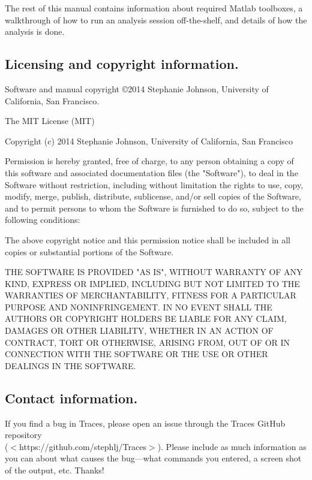 \documentclass[11pt]{article}
\newcommand{\sj}[1]{\textcolor{red}{#1}}
\begin{document}
The rest of this manual contains information about required Matlab toolboxes, a walkthrough of how to run an analysis session off-the-shelf, and details of how the analysis is done.


\subsection{Licensing and copyright information.}

Software and manual copyright \copyright 2014 Stephanie Johnson, University of California, San Francisco.

 The MIT License (MIT)
 
 Copyright (c) 2014 Stephanie Johnson, University of California, San Francisco
 
 Permission is hereby granted, free of charge, to any person obtaining a copy
 of this software and associated documentation files (the "Software"), to deal
 in the Software without restriction, including without limitation the rights
 to use, copy, modify, merge, publish, distribute, sublicense, and/or sell
 copies of the Software, and to permit persons to whom the Software is
 furnished to do so, subject to the following conditions:
 
 The above copyright notice and this permission notice shall be included in all
 copies or substantial portions of the Software.
 
 THE SOFTWARE IS PROVIDED "AS IS", WITHOUT WARRANTY OF ANY KIND, EXPRESS OR
 IMPLIED, INCLUDING BUT NOT LIMITED TO THE WARRANTIES OF MERCHANTABILITY,
 FITNESS FOR A PARTICULAR PURPOSE AND NONINFRINGEMENT. IN NO EVENT SHALL THE
 AUTHORS OR COPYRIGHT HOLDERS BE LIABLE FOR ANY CLAIM, DAMAGES OR OTHER
 LIABILITY, WHETHER IN AN ACTION OF CONTRACT, TORT OR OTHERWISE, ARISING FROM,
 OUT OF OR IN CONNECTION WITH THE SOFTWARE OR THE USE OR OTHER DEALINGS IN THE
 SOFTWARE.
    
\subsection{Contact information.}

If you find a bug in Traces, please open an issue through the Traces GitHub repository \\
($<$https://github.com/stephlj/Traces$>$). Please include as much information as you can about what causes the bug---what commands you entered, a screen shot of the output, etc.  Thanks!
\end{document}
